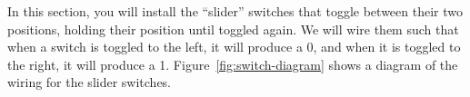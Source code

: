 In this section, you will install the ``slider'' switches that toggle between their two positions, holding their position until toggled again.
We will wire them such that when a switch is toggled to the left, it will produce a 0, and when it is toggled to the right, it will produce a 1.
Figure~\ref{fig:switch-diagram} shows a diagram of the wiring for the slider switches.

\begin{figure}[p]
    \centering
\end{figure}
